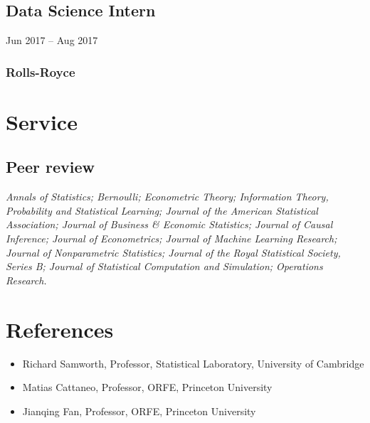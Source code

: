 \documentclass{wgu-cv}
\begin{document}
\subsection{Data Science Intern}
{Jun 2017 -- Aug 2017}
\subsubsection{Rolls-Royce}

\section{Service}

\subsection{Peer review}{}

\emph{%
  Annals of Statistics;
  Bernoulli;
  Econometric Theory;
  Information Theory, Probability and Statistical Learning;
  Journal of the American Statistical Association;
  Journal of Business \& Economic Statistics;
  Journal of Causal Inference;
  Journal of Econometrics;
  Journal of Machine Learning Research;
  Journal of Nonparametric Statistics;
  Journal of the Royal Statistical Society, Series B;
  Journal of Statistical Computation and Simulation;
  Operations Research.
}

\section{References}
\vspace{-0.22cm}

\begin{itemize}

  \item
    Richard Samworth,
    Professor,
    Statistical Laboratory,
    University of Cambridge

  \item
    Matias Cattaneo,
    Professor,
    ORFE,
    Princeton University


  \item
    Jianqing Fan,
    Professor,
    ORFE,
    Princeton University

\end{itemize}
\end{document}
